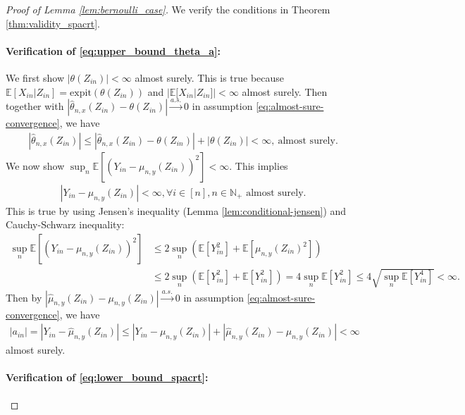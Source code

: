 \documentclass[12pt]{article}
\theoremstyle{definition}
\newcommand{\E}{\mathbb E}								%
\newcommand{\expit}{\mathrm{expit}}                 	%
\newcommand{\srx}{X}									%
\newcommand{\srz}{Z}									%
\newcommand{\sry}{Y}									%
\begin{document}
\begin{proof}[Proof of Lemma \ref{lem:bernoulli_case}]
	We verify the conditions in Theorem \ref{thm:validity_spacrt}.

	\paragraph{Verification of \eqref{eq:upper_bound_theta_a}:}
  We first show $|\theta(\srz_{in})|<\infty$ almost surely. This is true because $\E[\srx_{in}|\srz_{in}]=\expit(\theta(\srz_{in}))$ and $|\E[\srx_{in}|\srz_{in}]|<\infty$ almost surely. Then together with $|\widehat \theta_{n,x}(\srz_{in})-\theta(\srz_{in})|\overset{a.s.}{\rightarrow}0$ in assumption \eqref{eq:almost-sure-convergence}, we have
	\begin{align*}
		|\widehat \theta_{n,x}(\srz_{in})|\leq |\widehat \theta_{n,x}(\srz_{in})-\theta(\srz_{in})|+|\theta(\srz_{in})|<\infty,\ \text{almost surely}.
	\end{align*}
	We now show $\sup_n\E[(\sry_{in}-\mu_{n,y}(\srz_{in}))^2]<\infty$. This implies 
	\begin{align}\label{eq:bounded_y}
		|\sry_{in}-\mu_{n,y}(\srz_{in})|<\infty,\forall i\in [n],n\in\mathbb{N}_+\text{ almost surely}.
	\end{align}
	This is true by using Jensen's inequality (Lemma \ref{lem:conditional-jensen}) and Cauchy-Schwarz inequality:
	\begin{align*}
		\sup_n\E[(\sry_{in}-\mu_{n,y}(\srz_{in}))^2]
		&
		\leq 2\sup_n(\E[\sry_{in}^2]+\E[\mu_{n,y}(\srz_{in})^2])\\
		&
		\leq 2\sup_n(\E[\sry_{in}^2]+\E[\sry_{in}^2])=4\sup_n\E[\sry_{in}^2]\leq 4\sqrt{\sup_n\E[\sry_{in}^4]}<\infty.
	\end{align*}
	Then by $|\widehat{\mu}_{n,y}(\srz_{in})-\mu_{n,y}(\srz_{in})|\overset{a.s.}{\rightarrow}0$ in assumption \eqref{eq:almost-sure-convergence}, we have 
	\begin{align*}
		|a_{in}|=|\sry_{in}-\widehat{\mu}_{n,y}(\srz_{in})|\leq |\sry_{in}-\mu_{n,y}(\srz_{in})|+ |\widehat{\mu}_{n,y}(\srz_{in})-\mu_{n,y}(\srz_{in})|<\infty
	\end{align*}
	almost surely. 

	\paragraph{Verification of \eqref{eq:lower_bound_spacrt}:}


\end{proof}
\end{document}
